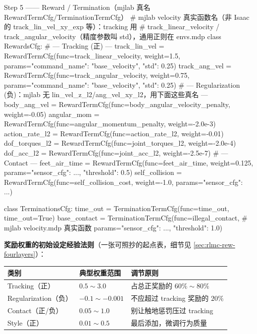 \begin{codebox}[Python]{Step 5 —— Reward / Termination（mjlab 真名 RewardTermCfg/TerminationTermCfg）}
# mjlab velocity 真实函数名（非 Isaac 的 track_lin_vel_xy_exp 等）：tracking 用
#   track_linear_velocity / track_angular_velocity（精度参数叫 std），通用正则在 envs.mdp
class RewardsCfg:
    # --- Tracking (正) ---
    track_lin_vel = RewardTermCfg(func=track_linear_velocity, weight=1.5,
                             params={"command_name": "base_velocity", "std": 0.25})
    track_ang_vel = RewardTermCfg(func=track_angular_velocity, weight=0.75,
                             params={"command_name": "base_velocity", "std": 0.25})
    # --- Regularization (负)：mjlab 无 lin_vel_z_l2/ang_vel_xy_l2，用下面这些真名 ---
    body_ang_vel   = RewardTermCfg(func=body_angular_velocity_penalty, weight=-0.05)
    angular_mom    = RewardTermCfg(func=angular_momentum_penalty,      weight=-2.0e-3)
    action_rate_l2 = RewardTermCfg(func=action_rate_l2,   weight=-0.01)
    dof_torques_l2 = RewardTermCfg(func=joint_torques_l2, weight=-2.0e-4)
    dof_acc_l2     = RewardTermCfg(func=joint_acc_l2,     weight=-2.5e-7)
    # --- Contact ---
    feet_air_time   = RewardTermCfg(func=feet_air_time, weight=0.125,
                                    params={"sensor_cfg": ..., "threshold": 0.5})
    self_collision  = RewardTermCfg(func=self_collision_cost, weight=-1.0,
                                    params={"sensor_cfg": ...})

class TerminationsCfg:
    time_out     = TerminationTermCfg(func=time_out, time_out=True)
    base_contact = TerminationTermCfg(func=illegal_contact,   # mjlab velocity.mdp 真实函数
                            params={"sensor_cfg": ..., "threshold": 1.0})
\end{codebox}

\textbf{奖励权重的初始设定经验法则}（一张可照抄的起点表，细节见 \cref{sec:rlmc-rew-fourlayers}）：

\begin{center}
\small
\begin{tabular}{@{}llp{6.0cm}@{}}
\toprule
类别 & 典型权重范围 & 调节原则 \\
\midrule
Tracking（正） & $0.5 \sim 3.0$ & 占总正奖励的 $60\%\sim 80\%$ \\
Regularization（负） & $-0.1 \sim -0.001$ & 不应超过 tracking 奖励的 $20\%$ \\
Contact（正/负） & $0.05 \sim 1.0$ & 别让触地惩罚压过 tracking \\
Style（正） & $0.01 \sim 0.5$ & 最后添加，微调行为质量 \\
\bottomrule
\end{tabular}
\end{center}


